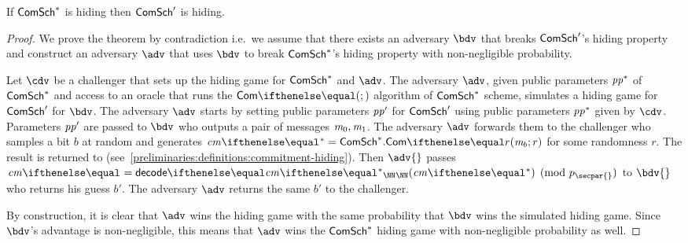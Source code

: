 \begin{theorem}[Hiding]\label{instantiation:th:com-bin-field-hiding}
    If $\mathsf{ComSch}^*$ is hiding then $\mathsf{ComSch}'$ is hiding.
\end{theorem}
\begin{proof}
	We prove the theorem by contradiction i.e.~we assume that there exists an adversary $\bdv$ that breaks $\mathsf{ComSch}'$'s hiding property and construct an adversary $\adv$ that uses $\bdv$ to break $\mathsf{ComSch}^*$'s hiding property with non-negligible probability.

  Let $\cdv$ be a challenger that sets up the hiding game for $\mathsf{ComSch}^*$ and $\adv$.
	The adversary $\adv$, given public parameters $\mathit{pp}^*$ of $\mathsf{ComSch}^*$ and access to an oracle that runs the $\commit{}{}$ algorithm of $\mathsf{ComSch}^*$ scheme, simulates a hiding game for $\mathsf{ComSch}'$ for $\bdv$.
  The adversary $\adv$ starts by setting public parameters $\mathit{pp}'$ for $\mathsf{ComSch}'$ using public parameters $\mathit{pp}^*$ given by $\cdv$. Parameters $\mathit{pp}'$ are passed to $\bdv$ who outputs a pair of messages $\mathit{m}_0, \mathit{m}_1$.
  The adversary $\adv$ forwards them to the challenger who samples a bit $b$ at random and generates $\cm{}^*= \comm^*.\commit{\msg_b}{r}$ for some randomness $r$. The result is returned to \adv{} (see~\cref{preliminaries:definitions:commitment-hiding}).
	Then $\adv{}$ passes $\cm{}= \decode{\cm{}^*}{\NN} \pmod{p_\secpar{}}$ to $\bdv{}$ who returns his guess $b'$. The adversary $\adv$ returns the same $b'$ to the challenger.

	By construction, it is clear that $\adv$ wins the hiding game with the same probability that $\bdv$ wins the simulated hiding game. Since $\bdv$'s advantage is non-negligible, this means that $\adv$ wins the $\mathsf{ComSch}^*$ hiding game with non-negligible probability as well.
\end{proof}

